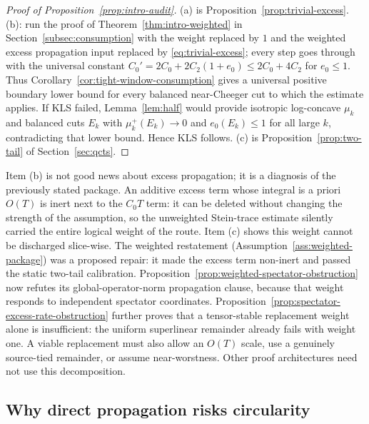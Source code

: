 \documentclass[../../main.tex]{subfiles}
\begin{document}
\begin{proof}[Proof of Proposition~\ref{prop:intro-audit}]
(a) is Proposition~\ref{prop:trivial-excess}. (b): run the proof of
Theorem~\ref{thm:intro-weighted} in Section~\ref{subsec:consumption} with the weight replaced
by $1$ and the weighted excess propagation input replaced by \eqref{eq:trivial-excess}; every
step goes through with the universal constant $C_0'=2C_0+2C_2(1+e_0)\le2C_0+4C_2$ for
$e_0\le1$. Thus Corollary~\ref{cor:tight-window-consumption} gives a universal positive
boundary lower bound for every balanced near-Cheeger cut to which the estimate applies. If KLS
failed, Lemma~\ref{lem:half} would provide isotropic log-concave $\mu_k$ and balanced cuts $E_k$
with $\mu_k^+(E_k)\to0$ and $e_0(E_k)\le1$ for all large $k$, contradicting that lower bound.
Hence KLS follows. (c) is Proposition~\ref{prop:two-tail} of Section~\ref{sec:qcts}.
\end{proof}

\begin{remark}
\label{rem:audit-interpretation}
Item (b) is not good news about excess propagation; it is a diagnosis of the previously stated
package. An additive excess term whose integral is a priori $O(T)$ is inert next to the $C_0T$
term: it can be deleted without changing the strength of the assumption, so the unweighted
Stein-trace estimate silently carried the entire logical weight of the route. Item (c) shows
this weight cannot be discharged slice-wise. The weighted restatement
(Assumption~\ref{ass:weighted-package}) was a proposed repair: it made the excess term non-inert
and passed the static two-tail calibration. Proposition~\ref{prop:weighted-spectator-obstruction}
now refutes its global-operator-norm propagation clause, because that weight responds to
independent spectator coordinates. Proposition~\ref{prop:spectator-excess-rate-obstruction}
further proves that a tensor-stable replacement weight alone is insufficient: the uniform
superlinear remainder already fails with weight one. A viable replacement must also allow an
$O(T)$ scale, use a genuinely source-tied remainder, or assume near-worstness. Other proof
architectures need not use this decomposition.
\end{remark}

\subsection{Why direct propagation risks circularity}
\label{subsec:circularity}
\end{document}
